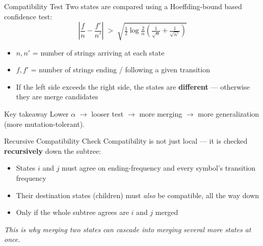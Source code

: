 \documentclass[aspectratio=169]{beamer}
\begin{document}
\begin{frame}{Compatibility Test}
  Two states are compared using a Hoeffding-bound based confidence test:
  \[
    \left| \frac{f}{n} - \frac{f'}{n'} \right|
    \;>\;
    \sqrt{\tfrac{1}{2}\log\tfrac{2}{\alpha}\left(\tfrac{1}{\sqrt{n}} + \tfrac{1}{\sqrt{n'}}\right)}
  \]
  \vspace{0.3cm}
  \begin{itemize}
    \item $n, n'$ = number of strings arriving at each state
    \item $f, f'$ = number of strings ending / following a given transition
    \item If the left side exceeds the right side, the states are
          \textbf{different} --- otherwise they are merge candidates
  \end{itemize}
  \vspace{0.3cm}
  \begin{alertblock}{Key takeaway}
    Lower $\alpha$ $\rightarrow$ looser test $\rightarrow$ more merging
    $\rightarrow$ more generalization (more mutation-tolerant).
  \end{alertblock}
\end{frame}

\begin{frame}{Recursive Compatibility Check}
  Compatibility is not just local --- it is checked \textbf{recursively}
  down the subtree:
  \begin{itemize}
    \item States $i$ and $j$ must agree on ending-frequency and
          every symbol's transition frequency
    \item Their destination states (children) must \emph{also} be
          compatible, all the way down
    \item Only if the whole subtree agrees are $i$ and $j$ merged
  \end{itemize}
  \vspace{0.3cm}
  \centering
  \textit{This is why merging two states can cascade into merging several
  more states at once.}
\end{frame}
\end{document}
